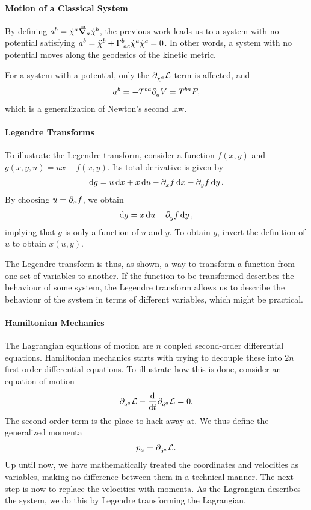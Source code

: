 \paragraph{Motion of a Classical System}
By defining $a^{b} = \dot{\chi}^{a}\grad_{a}{\dot{\chi}^{b}}$, the previous work leads us to a system with no potential satisfying $a^{b} = \ddot{\chi}^{b} + \Gamma^{b}_{\;ac}\dot{\chi}^{a}\dot{\chi}^{c} = 0$. In other words, a system with no potential moves along the geodesics of the kinetic metric.

For a system with a potential, only the $\partial^{}_{\chi^{a}}\mathcal{L}$ term is affected, and
\begin{align*}
	a^{b} = - T^{ba}\partial^{}_{a}V = T^{ba}F,
\end{align*}
which is a generalization of Newton's second law.

\paragraph{Legendre Transforms}
To illustrate the Legendre transform, consider a function $f(x, y)$ and $g(x, y, u) = ux - f(x, y)$. Its total derivative is given by
\begin{align*}
	\dd{g} = u\dd{x} + x\dd{u} - \partial^{}_{x}f\dd{x} - \partial^{}_{y}f\dd{y}.
\end{align*}
By choosing $u = \partial^{}_{x}f$, we obtain
\begin{align*}
	\dd{g} = x\dd{u} - \partial^{}_{y}f\dd{y},
\end{align*}
implying that $g$ is only a function of $u$ and $y$. To obtain $g$, invert the definition of $u$ to obtain $x(u, y)$.

The Legendre transform is thus, as shown, a way to transform a function from one set of variables to another. If the function to be transformed describes the behaviour of some system, the Legendre transform allows us to describe the behaviour of the system in terms of different variables, which might be practical.

\paragraph{Hamiltonian Mechanics}
The Lagrangian equations of motion are $n$ coupled second-order differential equations. Hamiltonian mechanics starts with trying to decouple these into $2n$ first-order differential equations. To illustrate how this is done, consider an equation of motion
\begin{align*}
	\partial^{}_{q^{a}}\mathcal{L} - \dv{t}\partial^{}_{\dot{q}^{a}}\mathcal{L} = 0.
\end{align*}
The second-order term is the place to hack away at. We thus define the generalized momenta
\begin{align*}
	p_{a} = \partial^{}_{\dot{q}^{a}}\mathcal{L}.
\end{align*}
Up until now, we have mathematically treated the coordinates and velocities as variables, making no difference between them in a technical manner. The next step is now to replace the velocities with momenta. As the Lagrangian describes the system, we do this by Legendre transforming the Lagrangian.

